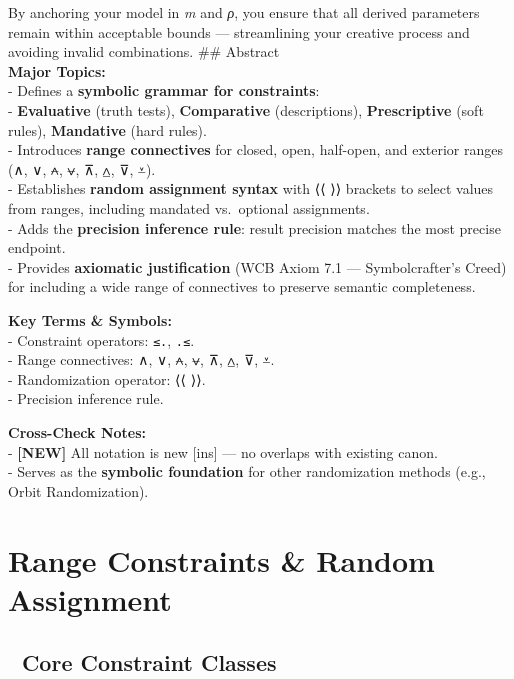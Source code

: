 \documentclass[
  letterpaper,
]{book}
\begin{document}
By anchoring your model in \emph{m} and \emph{ρ}, you ensure that all
derived parameters remain within acceptable bounds --- streamlining your
creative process and avoiding invalid combinations. \#\# Abstract\\
\textbf{Major Topics:}\\
- Defines a \textbf{symbolic grammar for constraints}:\\
- \textbf{Evaluative} (truth tests), \textbf{Comparative}
(descriptions), \textbf{Prescriptive} (soft rules), \textbf{Mandative}
(hard rules).\\
- Introduces \textbf{range connectives} for closed, open, half-open, and
exterior ranges (∧, ∨, ⩜, ⩝, ⊼, ⩟, ⊽, ⩡).\\
- Establishes \textbf{random assignment syntax} with ⟨⟨ ⟩⟩ brackets to
select values from ranges, including mandated vs.~optional
assignments.\\
- Adds the \textbf{precision inference rule}: result precision matches
the most precise endpoint.\\
- Provides \textbf{axiomatic justification} (WCB Axiom 7.1 ---
Symbolcrafter's Creed) for including a wide range of connectives to
preserve semantic completeness.

\textbf{Key Terms \& Symbols:}\\
- Constraint operators: \texttt{≤.}, \texttt{.≤}.\\
- Range connectives: ∧, ∨, ⩜, ⩝, ⊼, ⩟, ⊽, ⩡.\\
- Randomization operator: ⟨⟨ ⟩⟩.\\
- Precision inference rule.

\textbf{Cross-Check Notes:}\\
- \textbf{{[}NEW{]}} All notation is new {[}ins{]} --- no overlaps with
existing canon.\\
- Serves as the \textbf{symbolic foundation} for other randomization
methods (e.g., Orbit Randomization).

\chapter{Range Constraints \& Random
Assignment}\label{range-constraints-random-assignment}

\section{🧱 Core Constraint Classes}\label{core-constraint-classes}
\end{document}
